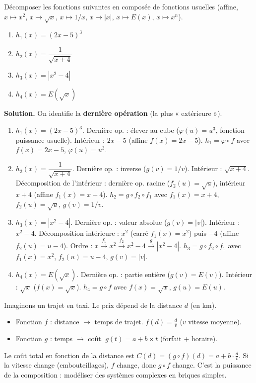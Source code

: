 \documentclass[11pt]{article}
\begin{document}
\begin{exoresolu}
Décomposer les fonctions suivantes en composée de fonctions usuelles (affine, $x \mapsto x^2$, $x \mapsto \sqrt{x}$, $x \mapsto 1/x$, $x \mapsto |x|$, $x \mapsto E(x)$, $x \mapsto x^n$).
\begin{enumerate}
    \item $h_1(x) = (2x-5)^3$
    \item $h_2(x) = \dfrac{1}{\sqrt{x+4}}$
    \item $h_3(x) = |x^2 - 4|$
    \item $h_4(x) = E(\sqrt{x})$
\end{enumerate}
\tcblower
\textbf{Solution.}
On identifie la \textbf{dernière opération} (la plus « extérieure »).

\begin{enumerate}
    \item $h_1(x) = (2x-5)^3$. Dernière op. : élever au cube ($\varphi(u)=u^3$, fonction puissance usuelle). Intérieur : $2x-5$ (affine $f(x)=2x-5$).
    $h_1 = \varphi \circ f$ avec $f(x)=2x-5$, $\varphi(u)=u^3$.
    \item $h_2(x) = \dfrac{1}{\sqrt{x+4}}$. Dernière op. : inverse ($g(v)=1/v$). Intérieur : $\sqrt{x+4}$.
    Décomposition de l'intérieur : dernière op. racine ($f_2(u)=\sqrt{u}$), intérieur $x+4$ (affine $f_1(x)=x+4$).
    $h_2 = g \circ f_2 \circ f_1$ avec $f_1(x)=x+4$, $f_2(u)=\sqrt{u}$, $g(v)=1/v$.
    \item $h_3(x) = |x^2 - 4|$. Dernière op. : valeur absolue ($g(v)=|v|$). Intérieur : $x^2-4$.
    Décomposition intérieure : $x^2$ (carré $f_1(x)=x^2$) puis $-4$ (affine $f_2(u)=u-4$).
    Ordre : $x \xrightarrow{f_1} x^2 \xrightarrow{f_2} x^2-4 \xrightarrow{g} |x^2-4|$.
    $h_3 = g \circ f_2 \circ f_1$ avec $f_1(x)=x^2$, $f_2(u)=u-4$, $g(v)=|v|$.
    \item $h_4(x) = E(\sqrt{x})$. Dernière op. : partie entière ($g(v)=E(v)$). Intérieur : $\sqrt{x}$ ($f(x)=\sqrt{x}$).
    $h_4 = g \circ f$ avec $f(x)=\sqrt{x}$, $g(u)=E(u)$.
\end{enumerate}
\end{exoresolu}

\begin{savaistu}
Imaginons un trajet en taxi. Le prix dépend de la distance $d$ (en km).
\begin{itemize}
    \item Fonction $f$ : distance $\to$ temps de trajet. $f(d) = \frac{d}{v}$ ($v$ vitesse moyenne).
    \item Fonction $g$ : temps $\to$ coût. $g(t) = a + b \times t$ (forfait + horaire).
\end{itemize}
Le coût total en fonction de la distance est $C(d) = (g \circ f)(d) = a + b \cdot \frac{d}{v}$.
Si la vitesse change (embouteillages), $f$ change, donc $g \circ f$ change. C'est la puissance de la composition : modéliser des systèmes complexes en briques simples.
\end{savaistu}
\end{document}
